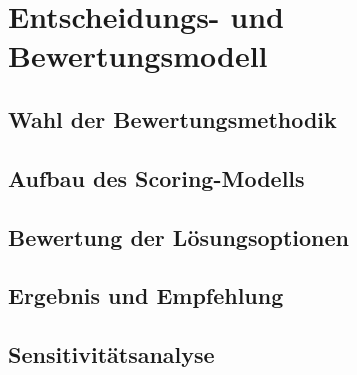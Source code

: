 \section{Entscheidungs- und Bewertungsmodell}

\subsection{Wahl der Bewertungsmethodik}

\subsection{Aufbau des Scoring-Modells}

\subsection{Bewertung der Lösungsoptionen}

\subsection{Ergebnis und Empfehlung}

\subsection{Sensitivitätsanalyse}
